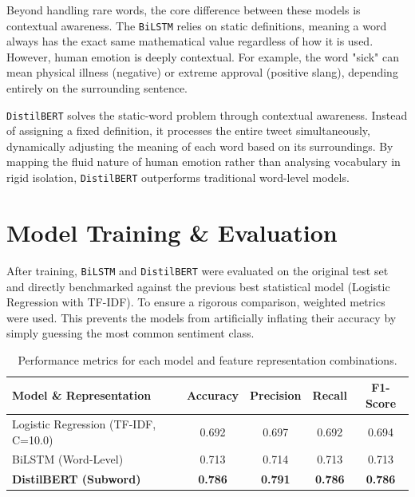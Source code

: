 \documentclass[12pt, a4paper]{article}
\begin{document}
\vspace{0.5cm}

Beyond handling rare words, the core difference between these models is contextual awareness. The \texttt{BiLSTM} relies on static definitions, meaning a word always has the exact same mathematical value regardless of how it is used. However, human emotion is deeply contextual. For example, the word "sick" can mean physical illness (negative) or extreme approval (positive slang), depending entirely on the surrounding sentence.

\vspace{0.5cm}

\texttt{DistilBERT} solves the static-word problem through contextual awareness. Instead of assigning a fixed definition, it processes the entire tweet simultaneously, dynamically adjusting the meaning of each word based on its surroundings. By mapping the fluid nature of human emotion rather than analysing vocabulary in rigid isolation, \texttt{DistilBERT} outperforms traditional word-level models.

\vspace{0.5cm}

\section{Model Training \& Evaluation}

\quad After training, \texttt{BiLSTM} and \texttt{DistilBERT} were evaluated on the original test set and directly benchmarked against the previous best statistical model (Logistic Regression with TF-IDF). To ensure a rigorous comparison, weighted metrics were used. This prevents the models from artificially inflating their accuracy by simply guessing the most common sentiment class.

\begin{table}[h!]
    \centering
    \renewcommand{\arraystretch}{1.5}
    \begin{tabular}{|l|c|c|c|c|}
        \hline
        \textbf{Model \& Representation} & \textbf{Accuracy} & \textbf{Precision} & \textbf{Recall} & \textbf{F1-Score} \\ \hline
        Logistic Regression (TF-IDF, C=10.0) & 0.692 & 0.697 & 0.692 & 0.694 \\ \hline
        BiLSTM (Word-Level) & 0.713 & 0.714 & 0.713 & 0.713 \\ \hline
        \textbf{DistilBERT (Subword)} & \textbf{0.786} & \textbf{0.791} & \textbf{0.786} & \textbf{0.786} \\ \hline
    \end{tabular}
    \caption{Performance metrics for each model and feature representation combinations.}
    \label{tab:model_performance}
\end{table}
\end{document}
